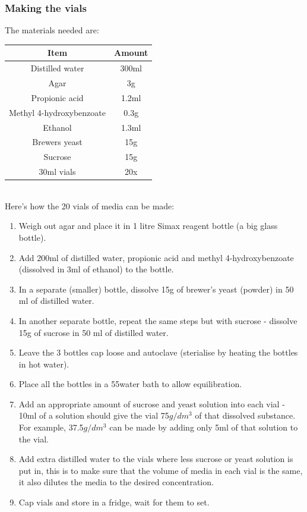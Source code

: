 \documentclass{article}
\begin{document}
\subsubsection{Making the vials}

The materials needed are:\\

{
\centering
\begin{tabular}{|c|c|}
  \hline
  Item & Amount\\
  \hline
  \hline
  Distilled water & 300ml\\
  Agar & 3g\\
  Propionic acid & 1.2ml\\
  Methyl 4-hydroxybenzoate & 0.3g\\
  Ethanol & 1.3ml\\
  Brewers yeast & 15g\\
  Sucrose & 15g\\
  30ml vials & 20x\\
  \hline
\end{tabular}
\par
}

\noindent\\
Here's how the 20 vials of media can be made:

\begin{enumerate}
  \item Weigh out agar and place it in 1 litre Simax reagent bottle (a big glass bottle).
  \item Add 200ml of distilled water,  propionic acid and methyl 4-hydroxybenzoate (dissolved in 3ml of ethanol) to the bottle.
  \item In a separate (smaller) bottle, dissolve 15g of brewer's yeast (powder) in 50 ml of distilled water.
  \item In another separate bottle, repeat the same steps but with sucrose - dissolve 15g of sucrose in 50 ml of distilled water.
  \item Leave the 3 bottles cap loose and autoclave (sterialise by heating the bottles in hot water).
  \item Place all the bottles in a 55\textcelsius water bath to allow equilibration.
  \item Add an appropriate amount of sucrose and yeast solution into each vial - 10ml of a solution should give the vial 75$g/dm^3$ of that dissolved substance. For example, 37.5$g/dm^3$ can be made by adding only 5ml of that solution to the vial.
  \item Add extra distilled water to the vials where less sucrose or yeast solution is put in, this is to make sure that the volume of media in each vial is the same, it also dilutes the media to the desired concentration.
  \item Cap vials and store in a fridge, wait for them to set.
\end{enumerate}
\end{document}
